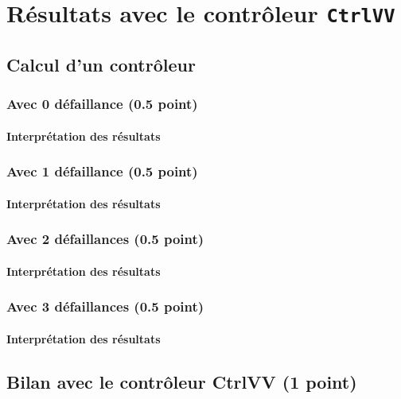 \documentclass[a4paper]{book}
\begin{document}
\section{Résultats avec le contrôleur {\tt CtrlVV}}
\subsection{Calcul d'un contrôleur}
\subsubsection{Avec 0 défaillance (0.5 point)}

\paragraph{Interprétation des résultats}

\subsubsection{Avec 1 défaillance (0.5 point)}

\paragraph{Interprétation des résultats}

\subsubsection{Avec 2 défaillances (0.5 point)}

\paragraph{Interprétation des résultats}

\subsubsection{Avec 3 défaillances (0.5 point)}

\paragraph{Interprétation des résultats}

\subsection{Bilan avec le contrôleur CtrlVV (1 point)}
\end{document}

